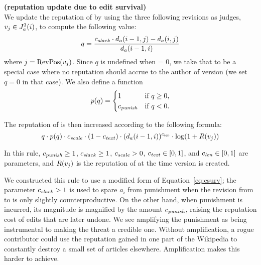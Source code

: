 \begin{regola}
\textbf{(reputation update due to edit survival)} \\
\label{rule-edit}
  We update the reputation of  by
  using the three following revisions as judges,
  $v_j \in J_{a}^{3}(i)$, to compute the following value:
\begin{equation*}
q = \frac{\slack \cdot \dist{a}{i-1,j} - \dist{a}{i,j}}
                        {\dist{a}{i-1,i}}
\label{eq-edit-long}
\end{equation*}
where $j = \mathrm{RevPos}(v_{j})$.
Since $q$ is undefined when  = 0,
we take that to be a special case where no reputation
should accrue to the author of version 
(\ie we set $q = 0$ in that case).
We also define a  function
\begin{equation*}
    p(q) =
        \begin{cases}
            1 & \text{if $q \ge 0$,} \\
            {c_{{\text{\textit{punish}}}}} & \text{if $q < 0$.} \\
        \end{cases}
\end{equation*}

The reputation of  is then increased
according to the following formula:
\begin{equation*}
q \cdot p(q)
  \cdot {c_{{\text{\textit{scale}}}}} \cdot (1 - {c_{{\text{\textit{text}}}}}) \cdot
        (d_{a}(i-1,i))^{c_{{\text{\textit{len}}}}} \cdot \log(1 + R(v_{j}))
\end{equation*}

  In this rule, ${c_{{\text{\textit{punish}}}}} \geq 1$, ${c_{{\text{\textit{slack}}}}} \geq 1$, ${c_{{\text{\textit{scale}}}}} > 0$,
  ${c_{{\text{\textit{text}}}}} \in [0,1]$, and ${c_{{\text{\textit{len}}}}} \in [0,1]$ are parameters,
  and $R(v_{j})$ is the reputation of 
  at the time version  is created.
\end{regola}

We constructed this rule to use a modified form of
Equation~\ref{eq:esurv};
the parameter ${c_{{\text{\textit{slack}}}}} > 1$ is used to spare $a_i$ from punishment when
the revision from  to  is only slightly
counterproductive.
On the other hand, when punishment is incurred, its magnitude is
magnified by the amount ${c_{{\text{\textit{punish}}}}}$, raising the reputation cost of
edits that are later undone.
We see amplifying the punishment as being instrumental
to making the threat a credible one.
Without amplification, a rogue contributor could use the reputation
gained in one part of the Wikipedia to constantly destroy a small set
of articles elsewhere.
Amplification makes this harder to achieve.

